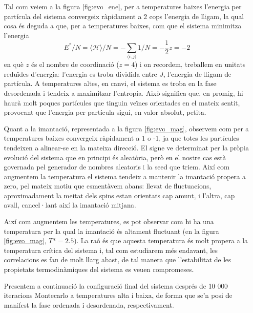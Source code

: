 \documentclass[a4paper]{article}
\begin{document}
Tal com veiem a la figura \ref{fig:evo_ene}, per a temperatures baixes l'energia per partícula del sistema convergeix ràpidament a 2 cops l'energia de lligam, la qual cosa és deguda a que, per a temperatures baixes, com que el sistema minimitza l'energia
\begin{equation*}
    E^*/N = \langle \mathcal{H} \rangle / N= -\sum_{\langle{i,j\rangle}} 1/N = -\frac{1}{2}z = -2
\end{equation*}
en què $z$ és el nombre de coordinació ($z=4$) i on recordem, treballem en unitats reduïdes d'energia: l'energia es troba dividida entre $J$, l'energia de lligam de partícula. A temperatures altes, en canvi, el sistema es troba en la fase desordenada i tendeix a maximitzar l'entropia. Això significa que, en promig, hi haurà molt poques partícules que tinguin veïnes orientades en el mateix sentit, provocant que l'energia per partícula sigui, en valor absolut, petita.

Quant a la imantació, representada a la figura \ref{fig:evo_mag}, observem com per a temperatures baixes convergeix ràpidament a 1 o -1, ja que totes les partícules tendeixen a alinear-se en la mateixa direcció. El signe ve determinat per la pròpia evolució del sistema que en principi és aleatòria, però en el nostre cas està governada pel generador de nombres aleatoris i la seed que triem. Així com augmentem la temperatura el sistema tendeix a mantenir la imantació propera a zero, pel mateix motiu que esmentàvem abans: llevat de fluctuacions, aproximadament la meitat dels spins estan orientats cap amunt, i l'altra, cap avall, cancel·lant així la imantació mitjana.

Així com augmentem les temperatures, es pot observar com hi ha una temperatura per la qual la imantació és altament fluctuant (en la figura \ref{fig:evo_mag}, $T*=2.5$). La raó és que aquesta temperatura és molt propera a la temperatura crítica del sistema i, tal com estudiarem més endavant, les correlacions es fan de molt llarg abast, de tal manera que l'estabilitat de les propietats termodinàmiques del sistema es veuen compromeses.

Presentem a continuació la configuració final del sistema després de 10 000 iteracions Montecarlo a temperatures alta i baixa, de forma que se'n posi de manifest la fase ordenada i desordenada, respectivament.
\end{document}
